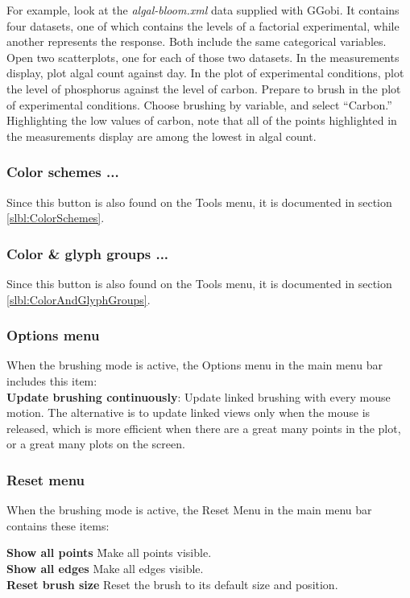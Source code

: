 \documentclass[11pt]{article}
\begin{document}
For example, look at the {\em algal-bloom.xml} data supplied with
GGobi.  It contains four datasets, one of which contains the levels
of a factorial experimental, while another represents the response.
Both include the same categorical variables.  Open two scatterplots,
one for each of those two datasets.  In the measurements display, plot
algal count against day.  In the plot of experimental conditions, plot
the level of phosphorus against the level of carbon.  Prepare to brush
in the plot of experimental conditions.  Choose brushing by variable,
and select ``Carbon.''  Highlighting the low values of carbon, note that
all of the points highlighted in the measurements display are among the
lowest in algal count.

\subsubsection{Color schemes ...}

Since this button is also found on the Tools menu, it is
documented in section \ref{slbl:ColorSchemes}.

\subsubsection{Color \& glyph groups ...}

Since this button is also found on the Tools menu, it is
documented in section \ref{slbl:ColorAndGlyphGroups}.

\subsubsection{Options menu}
%
When the brushing mode is active, the Options menu in the main
menu bar includes this item:
\medskip
\noindent
\\{\bf Update brushing continuously}: Update linked
  brushing with every mouse motion.  The alternative is to update linked
  views only when the mouse is released, which is more efficient when
  there are a great many points in the plot, or a great many plots on
  the screen.

\subsubsection{Reset menu}
%
When the brushing mode is active, the Reset Menu in the main
menu bar contains these items:

\begin{tabbing}
 {\bf Show all points} \hspace{.5in} \= Make all points visible. \\
 {\bf Show all edges} \> Make all edges visible. \\
 {\bf Reset brush size} \> Reset the brush to its default size and position. \\
\end{tabbing}
%
\end{document}
